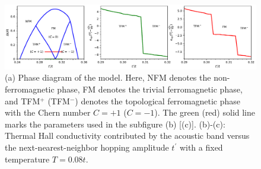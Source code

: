 \documentclass[amsmath,superscriptaddress,showpacs,aps,prl,onecolumn,notitlepage]{revtex4-1}
\begin{document}
\begin{figure}
\centering
\includegraphics[width=1.0\textwidth]{ThermalHallWithHopping}
\caption{(a) Phase diagram of the model. Here, NFM denotes the non-ferromagnetic phase, FM denotes the trivial ferromagnetic phase, and TFM$^+$ (TFM$^-$) denotes the topological ferromagnetic phase with the Chern number $C=+1$ ($C=-1$). The green (red) solid line marks the parameters used in the subfigure (b) [(c)]. (b)-(c):  Thermal Hall conductivity contributed by the acoustic band versus the next-nearest-neighbor hopping amplitude $t^\prime$ with a fixed temperature $T=0.08t$.}
\label{THWH}
\end{figure}

\end{document}

